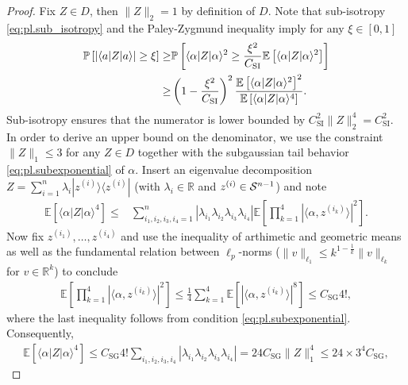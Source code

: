 \begin{proof}
Fix $ Z \in D$, then $\|  Z \|_2 =1$ by definition of $D$.
Note that sub-isotropy \eqref{eq:pl.sub_isotropy} and the Paley-Zygmund inequality imply for any $\xi \in [0,1]$
\begin{align}
  \mathbb{P} \left[ | \langle  a|  Z | a \rangle| \geq \xi \right]
  \geq & \mathbb{P} \left[ \langle  \alpha|  Z | \alpha \rangle^2 \geq \frac{\xi^2}{C_\mathrm{SI}} \mathbb{E} \left[ \langle  \alpha| Z| \alpha \rangle^2 \right] \right] \\
  \geq & \left(1-\frac{\xi^2}{C_\mathrm{SI}}\right)^2 \frac{\mathbb{E} \left[ \langle  \alpha | Z | \alpha \rangle^2 \right]^2}{\mathbb{E} \left[ \langle  \alpha|  Z | \alpha \rangle^4 \right]}.
\end{align}
Sub-isotropy ensures that the numerator is lower bounded by $C_\mathrm{SI}^2 \|  Z \|_2^4 = C_\mathrm{SI}^2$.
In order to derive an upper bound on the denominator, we use the constraint $\|  Z \|_1 \leq 3$ for any $ Z \in D$ together with the subgaussian tail behavior \eqref{eq:pl.subexponential} of $\alpha$.
Insert an eigenvalue decomposition $ Z = \sum_{i=1}^n \lambda_i | z^{(i)} \rangle \! \langle  z^{(i)}|$ (with $\lambda_i \in \mathbb{R}$ and $ z^{(i)} \in \mathcal{S}^{n-1}$) and note
\begin{align}
  \mathbb{E} \left[ \langle  \alpha|  Z | \alpha \rangle^4 \right]
  \leq & \sum_{i_1,i_2,i_3,i_4=1}^n | \lambda_{i_1} \lambda_{i_2} \lambda_{i_3} \lambda_{i_4} | \mathbb{E} \left[ \prod_{k=1}^4 | \langle  \alpha,  z^{(i_k)} \rangle|^2 \right]. \label{eq:pl.Q_aux1}
\end{align}
Now fix $ z^{(i_1)},\ldots, z^{(i_4)}$ and use the inequality of arthimetic and geometric means as well as the fundamental relation between $\ell_p$-norms ($\|  v \|_{\ell_1} \leq k^{1-\frac{1}{k}} \|  v \|_{\ell_k}$ for $v \in \mathbb{R}^k$) to conclude
\begin{align}
  \mathbb{E} \left[ \prod_{k=1}^4 | \langle  \alpha, z^{(i_k)}\rangle |^2 \right]
  \leq \frac{1}{4} \sum_{k=1}^4 \mathbb{E} \left[ | \langle  \alpha,  z^{(i_k)} \rangle|^8 \right]
  \leq C_\mathrm{SG} 4!,
\end{align}
where the last inequality follows from condition \eqref{eq:pl.subexponential}.
Consequently,
\begin{align}
  \mathbb{E} \left[ \langle  \alpha|  Z |  \alpha\rangle^4 \right]
  \leq C_\mathrm{SG} 4! \sum_{i_1,i_2,i_3,i_4} | \lambda_{i_1} \lambda_{i_2} \lambda_{i_3} \lambda_{i_4} |
  = 24 C_\mathrm{SG} \|  Z \|_1^4 \leq 24 \times 3^4 C_\mathrm{SG},

\end{align}
\end{proof}
